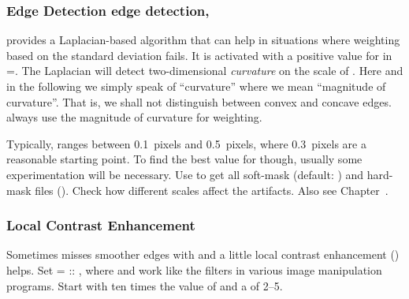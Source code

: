 \subsubsection[\propername{Laplacian} Edge Detection]{ Edge Detection
  \label{sec:laplacian-edge-detection}
         {edge detection, }}

\App{} provides a Laplacian-based algorithm that can help in
situations where weighting based on the standard deviation fails.  It
is activated with a positive value for  in
=.  The Laplacian will
detect two-dimensional \emph{curvature} on the scale of
.  Here and in the following we simply speak of
``curvature'' where we mean ``magnitude of curvature''.  That is, we
shall not distinguish between convex and concave edges.  \App{} always
use the magnitude of curvature for weighting.

Typically,  ranges between 0.1~pixels and 0.5~pixels,
where 0.3~pixels are a reasonable starting point.  To find the best
value for  though, usually some experimentation will be
necessary.  Use  to get all soft-mask (default:
\mbox{}) and hard-mask
files (\mbox{}).  Check how
different scales affect the artifacts.  Also see
Chapter~.


\subsubsection[Local Contrast Enhancement]{Local Contrast Enhancement
  \label{sec:local-contrast-enhancement}
  }

Sometimes \App{} misses smoother edges with
 and a little local contrast enhancement
() helps.  Set
=\feasiblebreak
{}:\feasiblebreak {}:\feasiblebreak
{}, where  and
 work like the
 filters in
various image manipulation programs.  Start with 
ten times the value of  and a  of
2--5.

